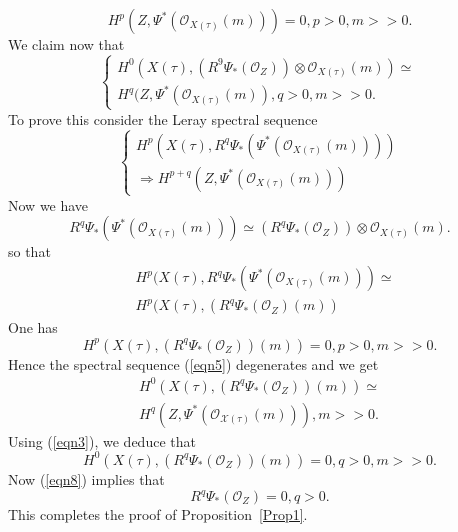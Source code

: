 \begin{Proof}
\begin{equation*}
H^{p}\left(Z, \Psi^{\ast}\left(\mathscr{O}_{X(\tau)}(m)\right)\right)=0, p>0, m>>0.\tag{3}
\end{equation*}
We claim now that 
\begin{equation*}\label{eqn4}
\begin{cases}
H^{0}(X(\tau), \left(R^{9}\Psi_{\ast}(\mathscr{O}_{Z})\right)\otimes \mathscr{O}_{X(\tau)}(m))\simeq\\
H^{q}(Z, \Psi^{\ast}\left(\mathscr{O}_{X(\tau)}(m)\right), q>0, m>>0.
\end{cases}\tag{4}
\end{equation*}
To prove this consider the Leray spectral sequence 
\begin{equation*}\label{eqn5}
\begin{cases}
H^{p}\left(X(\tau), R^{q}\Psi_{\ast}\left(\Psi^{\ast}\left(\mathscr{O}_{X(\tau)}(m)\right)\right)\right)\\
\Rightarrow H^{p+q}\left(Z, \Psi^{\ast}\left(\mathscr{O}_{X(\tau)}(m)\right)\right)
\end{cases}\tag{5}
\end{equation*}
Now we have 
$$
R^{q}\Psi_{\ast}\left(\Psi^{\ast}\left(\mathscr{O}_{X(\tau)}(m)\right)\right)\simeq \left(R^{q}\Psi_{\ast}(\mathscr{O}_Z)\right)\otimes \mathscr{O}_{X(\tau)}(m).
$$
so that\pageoriginale 
\begin{equation*}\label{eqn6}
\begin{aligned}
&H^{p}(X(\tau), R^{q}\Psi_{\ast}\left(\Psi^{\ast}\left(\mathscr{O}_{X(\tau)}(m)\right)\right)\simeq\\
&{}H^{p}(X(\tau), \left(R^{q}\Psi_{\ast}(\mathscr{O}_Z)(m)\right)
\end{aligned}\tag{6}
\end{equation*}
One has 
$$
H^{p}(X(\tau), \left(R^{q}\Psi_{\ast}(\mathscr{O}_Z)\right)(m))=0, p>0, m>>0.
$$
Hence the spectral sequence (\ref{eqn5}) degenerates and we get 
\begin{equation*}\label{eqn7}
\begin{aligned}
H^{0}(X(\tau), \left(R^{q}\Psi_{\ast}(\mathscr{O}_Z)\right)(m))\simeq\\
H^{q}\left(Z, \Psi^{\ast}\left(\mathscr{O}_{\mathcal{X(\tau)}}(m)\right)\right), m>>0.
\end{aligned}\tag{7}
\end{equation*}
Using (\ref{eqn3}), we deduce that 
\begin{equation*}\label{eqn8}
H^{0}(X(\tau), \left(R^{q} \Psi_{\ast}(\mathscr{O}_Z)\right)(m))=0, q>0, m>>0.\tag{8}
\end{equation*}
Now (\ref{eqn8}) implies that 
$$
R^{q}\Psi_{\ast}(\mathscr{O}_Z)=0, q>0.
$$
This completes the proof of Proposition~\ref{Prop1}. 
\end{Proof}

